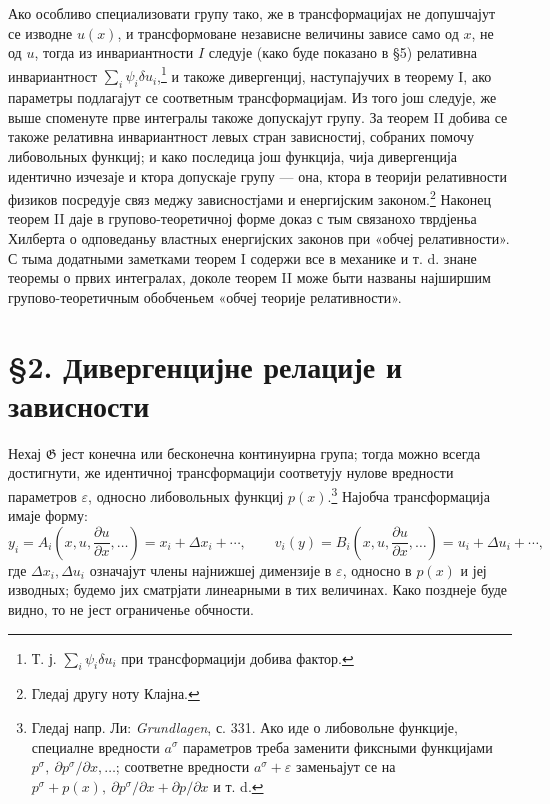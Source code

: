 ﻿\documentclass[11pt]{article}
\providecommand{\G}{\mathfrak G}
\providecommand{\eps}{\varepsilon}
\providecommand{\D}{\Delta}
\providecommand{\p}{\partial}
\begin{document}
Ако особливо специализовати групу тако, же в трансформацијах не допушчајут се изводне \(u(x)\), и трансформоване независне величины зависе само од \(x\), не од \(u\), тогда из инвариантности \(I\) следује (како буде показано в \S{}5) релативна инвариантност \(\sum_i\psi_i\delta u_i\),\footnote{Т. ј. \(\sum_i\psi_i\delta u_i\) при трансформацији добива фактор.} и такоже дивергенциј, наступајучих в теорему I, ако параметры подлагајут се соответным трансформацијам. Из того још следује, же выше споменуте прве интегралы такоже допускајут групу. За теорем II добива се такоже релативна инвариантност левых стран зависностиј, собраних помочу либовольных функциј; и како последица још функција, чија дивергенција идентично изчезаје и ктора допускаје групу --- она, ктора в теорији релативности физиков посредује связ меджу зависностјами и енергијским законом.\footnote{Гледај другу ноту Клајна.} Наконец теорем II даје в групово-теоретичној форме доказ с тым связанохо тврдјеньа Хилберта о одповеданьу властных енергијских законов при «обчеј релативности». С тыма додатными заметками теорем I содержи все в механике и т. d. знане теоремы о првих интегралах, доколе теорем II може быти названы најширшим групово-теоретичным обобченьем «обчеј теорије релативности».

\section*{\S{}2. Дивергенцијне релације и зависности}

Нехај \(\G\) јест конечна или бесконечна континуирна група; тогда можно всегда достигнути, же идентичној трансформацији соответују нулове вредности параметров \(\eps\), односно либовольных функциј \(p(x)\).\footnote{Гледај напр. Ли: \emph{Grundlagen}, с. 331. Ако иде о либовольне функције, специалне вредности \(a^\sigma\) параметров треба заменити фиксными функцијами \(p^\sigma,\ \p p^\sigma/\p x,\ldots\); соответне вредности \(a^\sigma+\eps\) заменьајут се на \(p^\sigma+p(x),\ \p p^\sigma/\p x+\p p/\p x\) и т. d.} Најобча трансформација имаје форму:
\[
y_i=A_i\!\left(x,u,\frac{\p u}{\p x},\ldots\right)=x_i+\D x_i+\cdots,\qquad
v_i(y)=B_i\!\left(x,u,\frac{\p u}{\p x},\ldots\right)=u_i+\D u_i+\cdots,
\]
где \(\D x_i,\D u_i\) означајут члены најнижшеј димензије в \(\eps\), односно в \(p(x)\) и јеј изводных; будемо јих сматрјати линеарными в тих величинах. Како позднеје буде видно, то не јест ограниченье обчности.
\end{document}
